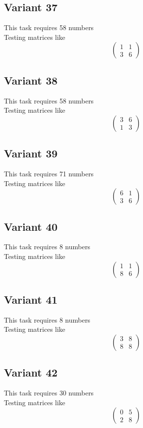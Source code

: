 \documentclass[11pt]{article}
\begin{document}
\subsection*{Variant 37}
This task requires 58 numbers\\
Testing matrices like \[ \begin{pmatrix} 1 & 1\\ 3 & 6 \end{pmatrix} \]

\subsection*{Variant 38}
This task requires 58 numbers\\
Testing matrices like \[ \begin{pmatrix} 3 & 6\\ 1 & 3 \end{pmatrix} \]

\subsection*{Variant 39}
This task requires 71 numbers\\
Testing matrices like \[ \begin{pmatrix} 6 & 1\\ 3 & 6 \end{pmatrix} \]

\subsection*{Variant 40}
This task requires 8 numbers\\
Testing matrices like \[ \begin{pmatrix} 1 & 1\\ 8 & 6 \end{pmatrix} \]

\subsection*{Variant 41}
This task requires 8 numbers\\
Testing matrices like \[ \begin{pmatrix} 3 & 8\\ 8 & 8 \end{pmatrix} \]

\subsection*{Variant 42}
This task requires 30 numbers\\
Testing matrices like \[ \begin{pmatrix} 0 & 5\\ 2 & 8 \end{pmatrix} \]
\end{document}

